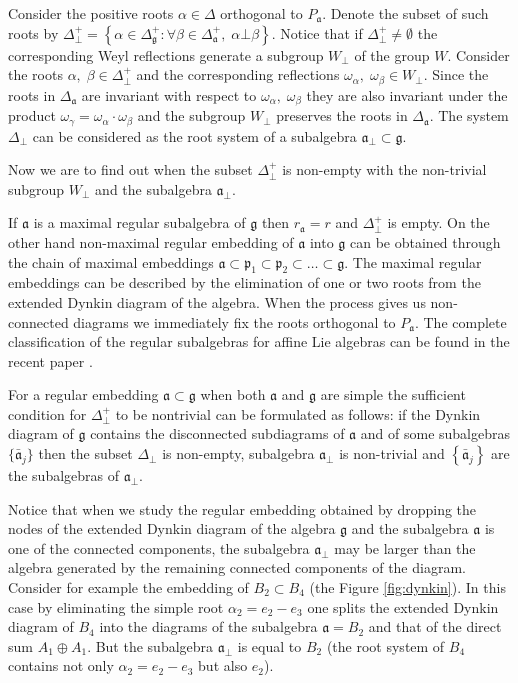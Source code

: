 \documentclass[12pt]{iopart}
\begin{document}
Consider the positive roots $\alpha\in \Delta$ orthogonal to $P_{\mathfrak{a}}$. Denote the subset of such roots by $\Delta^{+}_{\bot}
=\left\{\alpha\in\Delta_{\mathfrak{g}}^{+}:
\forall \beta\in \Delta_{\mathfrak{a}}^{+},\; \alpha\bot\beta \right\}$.
Notice that if $\Delta^{+}_{\bot}\neq \emptyset$ the corresponding Weyl reflections
generate a subgroup $W_{\bot}$ of the group $W$. Consider the roots $\alpha,\;
\beta\in \Delta^{+}_{\bot}$ and the corresponding reflections
$\omega_{\alpha},\; \omega_{\beta}\in W_{\bot}$.  Since the roots in $\Delta_{\mathfrak{a}}$
are invariant with respect to $\omega_{\alpha}, \; \omega_{\beta}$ they
are also invariant under the product $\omega_{\gamma}=\omega_{\alpha}\cdot \omega_{\beta}$
and the subgroup $W_{\bot}$ preserves the roots in $\Delta_{\mathfrak{a}}$.
The system $\Delta_{\bot}$
can be considered as the root system of a subalgebra $\mathfrak{a}_{\bot}\subset \mathfrak{g}$.

Now we are to find out when the subset $\Delta^{+}_{\bot}$ is non-empty with the non-trivial subgroup $W_{\bot}$ and the subalgebra $\mathfrak{a}_{\bot}$.

If $\mathfrak{a}$ is a maximal regular subalgebra of $\mathfrak{g}$ then $r_{\mathfrak{a}}=r$ and
 $\Delta^{+}_{\bot}$ is empty.
On the other hand
non-maximal regular embedding of $\mathfrak{a}$ into $\mathfrak{g}$ can be obtained
through the chain of maximal embeddings
$\mathfrak{a}\subset \mathfrak{p}_1\subset \mathfrak{p}_2\subset\dots \subset \mathfrak{g}$.
The maximal regular embeddings can be described by the elimination of one or two roots
from the extended Dynkin diagram of the algebra. When the process gives us
non-connected diagrams we immediately fix the roots orthogonal to $P_{\mathfrak{a}}$.  The complete classification of the regular subalgebras for affine Lie algebras can be found in the recent paper \cite{1751-8121-41-36-365204}.

For a regular embedding $\mathfrak{a}\subset \mathfrak{g}$ when both $\mathfrak{a}$ and $\mathfrak{g}$ are simple the sufficient condition for $\Delta^{+}_{\bot}$ to be nontrivial can be formulated as follows:
if the Dynkin diagram of $\mathfrak{g}$ contains the disconnected
subdiagrams of $\mathfrak{a}$ and of some subalgebras $\{\mathfrak{\bar{a}}_j\}$
then the subset $\Delta_{\bot}$ is non-empty,
subalgebra $\mathfrak{a}_{\bot}$ is non-trivial and
$\left\{\mathfrak{\bar{a}}_j\right\}$ are the subalgebras of $\mathfrak{a}_{\bot}$.

Notice that when we study the regular embedding obtained by dropping the nodes
of the extended Dynkin diagram of the algebra $\mathfrak{g}$ and the
subalgebra $\mathfrak{a}$ is one of the connected components,
the subalgebra $\mathfrak{a}_{\bot}$ may be larger than the algebra
generated by the remaining connected components of the diagram.
Consider for example the embedding of $B_2\subset B_4$ (the Figure \ref{fig:dynkin}).
In this case by eliminating
the simple root $\alpha_2=e_2-e_3$ one splits the extended Dynkin diagram of $B_4$
into the diagrams of the subalgebra $\mathfrak{a}=B_2$ and that of the direct
sum $A_1 \oplus A_1 $. But the subalgebra $\mathfrak{a}_{\bot}$ is equal to $B_2$ (the root system of $B_4$ contains not only $\alpha_2=e_2-e_3$ but also $e_2$).
\end{document}
